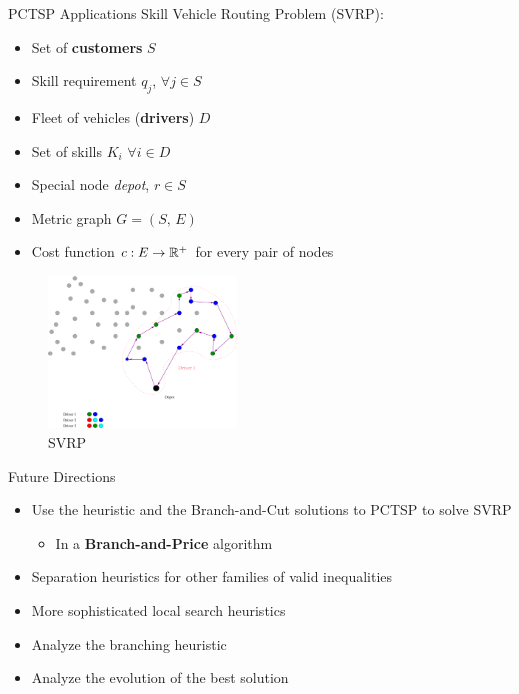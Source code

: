 \begin{frame}[t]{PCTSP Applications}
    Skill Vehicle Routing Problem (SVRP):
    \begin{minipage}[t]{0.48\textwidth}
        \begin{itemize}
            \item Set of \textbf{customers} $S$
            \item Skill requirement $q_j$,  $\forall j \in S$
            \item Fleet of vehicles (\textbf{drivers}) $D$
            \item Set of skills $K_i$ $\forall i \in D$
            \item Special node \emph{depot}, $r \in S$
            \item Metric graph $G = (S, \, E)$            
            \item Cost function $c:E \rightarrow \mathbb{R}^+$ for every pair of nodes
        \end{itemize}
    \end{minipage}
    \begin{minipage}[t]{0.48\textwidth}
        \begin{figure}
            \centering
            \includegraphics[width=5cm]{VRPSS03.pdf}
            \caption{SVRP}
            \label{fig:VRPSS02}
        \end{figure}            
    \end{minipage}    
\end{frame}

\begin{frame}[t]{Future Directions}
    \begin{itemize}
        \item<1-> Use the heuristic and the Branch-and-Cut solutions to PCTSP to solve SVRP
            \begin{itemize}
                \item<2-> In a \textbf{Branch-and-Price} algorithm
            \end{itemize}
        \item<3-> Separation heuristics for other families of valid inequalities
        \item<4-> More sophisticated local search heuristics
        \item<5-> Analyze the branching heuristic
        \item<6-> Analyze the evolution of the best solution
    \end{itemize}
\end{frame}

